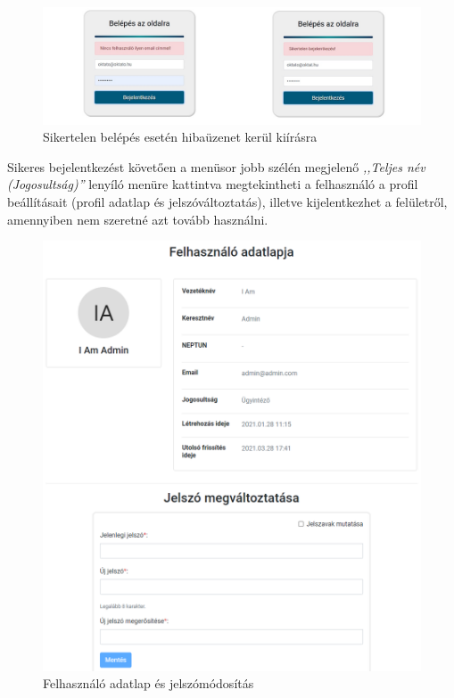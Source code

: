 \documentclass[
]{thesis-ekf}
\theoremstyle{definition}
\theoremstyle{remark}
\begin{document}
	\begin{figure}[!h]
		\centering
		\includegraphics[width=15cm]{kepek/screenshots/sikertelen_belepes.jpg}
		\caption{Sikertelen belépés esetén hibaüzenet kerül kiírásra}
		\label{fig:sikertelen_belepes}
	\end{figure}
	
	Sikeres bejelentkezést követően a menüsor jobb szélén megjelenő \emph{,,Teljes név (Jogosultság)''} lenyíló menüre kattintva megtekintheti a felhasználó a profil beállításait (profil adatlap és jelszóváltoztatás), illetve kijelentkezhet a felületről, amennyiben nem szeretné azt tovább használni.
	
	\begin{figure}[!h]
		\centering
		\includegraphics[width=15cm]{kepek/screenshots/ugyintezo_beallitasok.png}
		\caption{Felhasználó adatlap és jelszómódosítás}
		\label{fig:ugyint_felhasznalo_profil}
	\end{figure}
	
\end{document}
